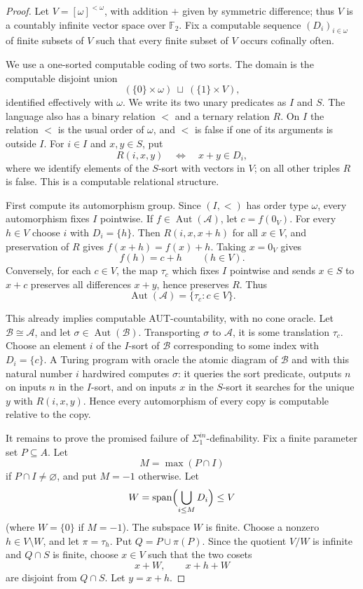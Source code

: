 \documentclass[12pt]{article}
\newcommand{\Aut}{\operatorname{Aut}}
\newcommand{\spanv}{\operatorname{span}}
\begin{document}
\begin{proof}
Let $V=[\omega]^{<\omega}$, with addition $+$ given by symmetric
difference; thus $V$ is a countably infinite vector space over
$\mathbb F_2$.  Fix a computable sequence $(D_i)_{i\in\omega}$ of finite
subsets of $V$ such that every finite subset of $V$ occurs cofinally
often.

We use a one-sorted computable coding of two sorts.  The domain is the
computable disjoint union
\[
        (\{0\}\times\omega)\ \sqcup\ (\{1\}\times V),
\]
identified effectively with $\omega$.  We write its two unary predicates
as $I$ and $S$.  The language also has a binary relation $<$ and a
ternary relation $R$.  On $I$ the relation $<$ is the usual order of
$\omega$, and $<$ is false if one of its arguments is outside $I$.  For
$i\in I$ and $x,y\in S$, put
\[
        R(i,x,y)\quad\Longleftrightarrow\quad x+y\in D_i,
\]
where we identify elements of the $S$-sort with vectors in $V$; on all
other triples $R$ is false.  This is a computable relational structure.

First compute its automorphism group.  Since $(I,<)$ has order type
$\omega$, every automorphism fixes $I$ pointwise.  If
$f\in\Aut(\mathcal A)$, let $c=f(0_V)$.  For every $h\in V$ choose $i$
with $D_i=\{h\}$.  Then $R(i,x,x+h)$ for all $x\in V$, and preservation
of $R$ gives $f(x+h)=f(x)+h$.  Taking $x=0_V$ gives
\[
        f(h)=c+h  \qquad(h\in V).
\]
Conversely, for each $c\in V$, the map $\tau_c$ which fixes $I$
pointwise and sends $x\in S$ to $x+c$ preserves all differences $x+y$,
hence preserves $R$.  Thus
\[
        \Aut(\mathcal A)=\{\tau_c:c\in V\}.
\]

This already implies computable AUT-countability, with no cone oracle.
Let $\mathcal B\cong\mathcal A$, and let $\sigma\in\Aut(\mathcal B)$.
Transporting $\sigma$ to $\mathcal A$, it is some translation $\tau_c$.
Choose an element $i$ of the $I$-sort of $\mathcal B$ corresponding to
some index with $D_i=\{c\}$.  A Turing program with oracle the atomic
diagram of $\mathcal B$ and with this natural number $i$ hardwired
computes $\sigma$: it queries the sort predicate, outputs $n$ on inputs
$n$ in the $I$-sort, and on inputs $x$ in the $S$-sort it searches for
the unique $y$ with $R(i,x,y)$.  Hence every automorphism of every copy
is computable relative to the copy.

It remains to prove the promised failure of $\Sigma^{in}_1$-definability.
Fix a finite parameter set $P\subseteq A$.  Let
\[
        M=\max(P\cap I)
\]
if $P\cap I\neq\varnothing$, and put $M=-1$ otherwise.  Let
\[
        W=\spanv\Bigl(\bigcup_{i\le M}D_i\Bigr)\le V
\]
(where $W=\{0\}$ if $M=-1$).  The subspace $W$ is finite.  Choose a
nonzero $h\in V\setminus W$, and let $\pi=\tau_h$.  Put
$Q=P\cup\pi(P)$.  Since the quotient $V/W$ is infinite and $Q\cap S$ is
finite, choose $x\in V$ such that the two cosets
\[
        x+W,\qquad x+h+W
\]
are disjoint from $Q\cap S$.  Let $y=x+h$.


\end{proof}
\end{document}
